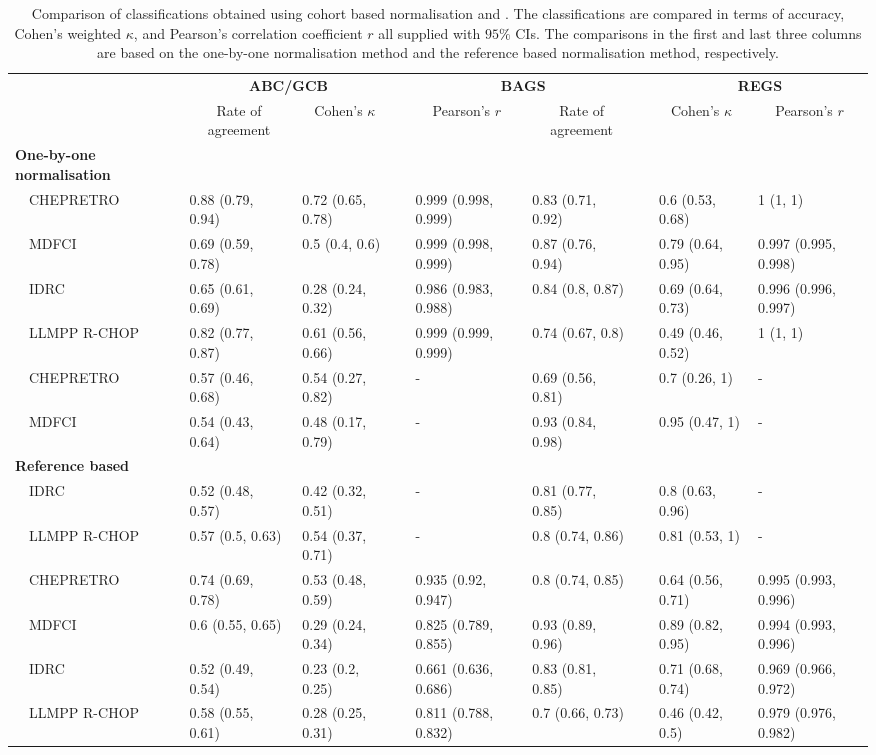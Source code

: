 \begin{table}[!tbp]
{\scriptsize
\caption{Comparison of classifications obtained using cohort based
normalisation and \hemaClass{}.
The classifications are compared in terms of accuracy, Cohen's weighted
$\kappa$, and Pearson's correlation coefficient $r$ all supplied with $95\%$
CIs. The comparisons in the first and last three columns are based on the
one-by-one normalisation method and the reference based normalisation method,
respectively.\label{tab:classALL}} 
\begin{center}
\begin{tabular}{lllcllcll}
\hline\hline
\multicolumn{1}{l}{\bfseries }&\multicolumn{2}{c}{\bfseries ABC/GCB}&\multicolumn{1}{c}{\bfseries }&\multicolumn{2}{c}{\bfseries BAGS}&\multicolumn{1}{c}{\bfseries }&\multicolumn{2}{c}{\bfseries REGS}\tabularnewline
\cline{2-3} \cline{5-6} \cline{8-9}
\multicolumn{1}{l}{}&\multicolumn{1}{c}{Rate of agreement}&\multicolumn{1}{c}{Cohen's $\kappa$}&\multicolumn{1}{c}{}&\multicolumn{1}{c}{Pearson's $r$}&\multicolumn{1}{c}{Rate of agreement}&\multicolumn{1}{c}{}&\multicolumn{1}{c}{Cohen's $\kappa$}&\multicolumn{1}{c}{Pearson's $r$}\tabularnewline
\hline
{\bfseries One-by-one normalisation}&&&&&&&&\tabularnewline
~~CHEPRETRO&0.88 (0.79, 0.94)&0.72 (0.65, 0.78)&&0.999 (0.998, 0.999)&0.83 (0.71, 0.92)&&0.6 (0.53, 0.68)&1 (1, 1)\tabularnewline
~~MDFCI&0.69 (0.59, 0.78)&0.5 (0.4, 0.6)&&0.999 (0.998, 0.999)&0.87 (0.76, 0.94)&&0.79 (0.64, 0.95)&0.997 (0.995, 0.998)\tabularnewline
~~IDRC&0.65 (0.61, 0.69)&0.28 (0.24, 0.32)&&0.986 (0.983, 0.988)&0.84 (0.8, 0.87)&&0.69 (0.64, 0.73)&0.996 (0.996, 0.997)\tabularnewline
~~LLMPP R-CHOP&0.82 (0.77, 0.87)&0.61 (0.56, 0.66)&&0.999 (0.999, 0.999)&0.74 (0.67, 0.8)&&0.49 (0.46, 0.52)&1 (1, 1)\tabularnewline
~~CHEPRETRO&0.57 (0.46, 0.68)&0.54 (0.27, 0.82)&&-&0.69 (0.56, 0.81)&&0.7 (0.26, 1)&-\tabularnewline
~~MDFCI&0.54 (0.43, 0.64)&0.48 (0.17, 0.79)&&-&0.93 (0.84, 0.98)&&0.95 (0.47, 1)&-\tabularnewline
\hline
{\bfseries Reference based}&&&&&&&&\tabularnewline
~~IDRC&0.52 (0.48, 0.57)&0.42 (0.32, 0.51)&&-&0.81 (0.77, 0.85)&&0.8 (0.63, 0.96)&-\tabularnewline
~~LLMPP R-CHOP&0.57 (0.5, 0.63)&0.54 (0.37, 0.71)&&-&0.8 (0.74, 0.86)&&0.81 (0.53, 1)&-\tabularnewline
~~CHEPRETRO&0.74 (0.69, 0.78)&0.53 (0.48, 0.59)&&0.935 (0.92, 0.947)&0.8 (0.74, 0.85)&&0.64 (0.56, 0.71)&0.995 (0.993, 0.996)\tabularnewline
~~MDFCI&0.6 (0.55, 0.65)&0.29 (0.24, 0.34)&&0.825 (0.789, 0.855)&0.93 (0.89, 0.96)&&0.89 (0.82, 0.95)&0.994 (0.993, 0.996)\tabularnewline
~~IDRC&0.52 (0.49, 0.54)&0.23 (0.2, 0.25)&&0.661 (0.636, 0.686)&0.83 (0.81, 0.85)&&0.71 (0.68, 0.74)&0.969 (0.966, 0.972)\tabularnewline
~~LLMPP R-CHOP&0.58 (0.55, 0.61)&0.28 (0.25, 0.31)&&0.811 (0.788, 0.832)&0.7 (0.66, 0.73)&&0.46 (0.42, 0.5)&0.979 (0.976, 0.982)\tabularnewline
\hline
\end{tabular}\end{center}}

\end{table}
